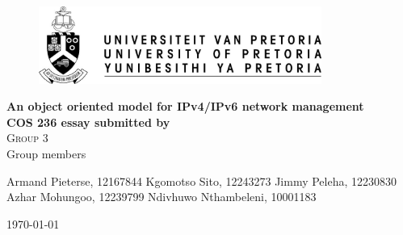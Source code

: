 \begin{titlepage}
	\begin{center}
		
		\begin{figure}[t]
			\centering
			\includegraphics[width=350px]{images/up-logo.jpg}
		\end{figure}
		
		\textbf{\Huge An object oriented model for IPv4/IPv6 network management} \\ 
		\vspace{2cm}
		\textbf{\large COS 236 essay submitted by} \\ 
		\textsc{\large Group 3} \\ 
		\vspace{2cm}
		\large Group members \\ 
		
		\begin{flushright} \large
			Armand Pieterse, 12167844 \newline
			Kgomotso Sito, 12243273 \newline
			Jimmy Peleha, 12230830 \newline
			Azhar Mohungoo, 12239799 \newline
			Ndivhuwo Nthambeleni, 10001183 \newline
			\end{flushright}
		\textsc{\large \today}
		
		\vfill
		
	\vfill
	\end{center}
\end{titlepage}
